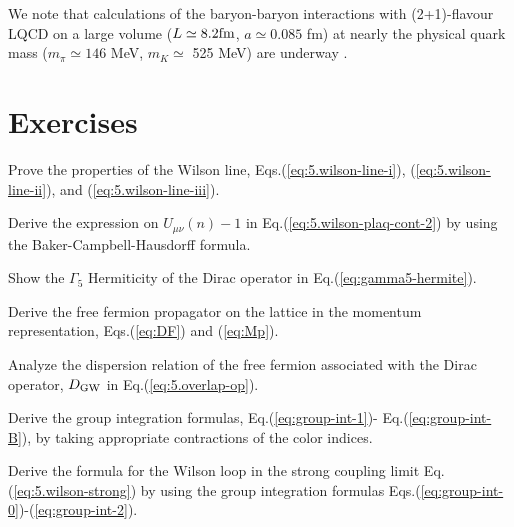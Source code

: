  We note that calculations of the baryon-baryon interactions  with  
  (2+1)-flavour LQCD on a large volume ($L \simeq 8.2 {\rm fm}$, $a\simeq 0.085$ fm) at
   nearly the physical quark mass ($m_{\pi}\simeq146$ MeV, $m_{K}\simeq$ 525 MeV)
   are underway  \cite{Doi:2015oha}.
 
  
\section{Exercises}

\begin{prob} \label{prob:1}
Prove the properties of the Wilson line, Eqs.(\ref{eq:5.wilson-line-i}), (\ref{eq:5.wilson-line-ii}), and (\ref{eq:5.wilson-line-iii}).
\end{prob}

\begin{prob}\label{prob:2}
Derive the expression on $U_{\mu \nu}(n)-1$ in 
Eq.(\ref{eq:5.wilson-plaq-cont-2}) by using the Baker-Campbell-Hausdorff formula.
\end{prob}

\begin{prob}\label{prob:3}
Show the $\Gamma_5$ Hermiticity of the Dirac operator in Eq.(\ref{eq:gamma5-hermite}).
\end{prob}

\begin{prob}\label{prob:4}
Derive  the free fermion propagator on the lattice in the momentum representation,
Eqs.(\ref{eq:DF}) and (\ref{eq:Mp}). 
\end{prob}

\begin{prob}\label{prob:5}
Analyze the dispersion relation of the free fermion associated with the 
Dirac operator, $D_{\rm GW}$ in Eq.(\ref{eq:5.overlap-op}).
\end{prob}

\begin{prob}\label{prob:6}
Derive the group integration formulas, Eq.(\ref{eq:group-int-1})- Eq.(\ref{eq:group-int-B}), by taking appropriate 
contractions of the color indices.
\end{prob}


\begin{prob}\label{prob:7}
Derive the formula for the Wilson loop in the strong coupling limit Eq.(\ref{eq:5.wilson-strong}) by using the group integration formulas
Eqs.(\ref{eq:group-int-0})-(\ref{eq:group-int-2}). 
\end{prob}

